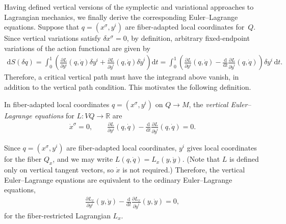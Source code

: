 \documentclass[pdftex]{sigma}
\numberwithin{equation}{section}
\begin{document}
Having def\/ined vertical versions of the symplectic and variational approaches to Lagrangian mechanics, we f\/inally derive the corresponding Euler--Lagrange equations. Suppose that $ q = ( x ^\sigma , y ^i ) $ are f\/iber-adapted local coordinates for~$Q$. Since vertical variations satisfy $ \delta x ^\sigma = 0 $, by def\/inition, arbitrary f\/ixed-endpoint variations of the action functional are given by
\begin{gather*}
 \mathrm{d} S ( \delta q )= \int _0 ^1 \left( \frac{ \partial L }{ \partial y ^i } ( q, \dot{q} ) \delta y ^i + \frac{ \partial L }{ \partial \dot{y} ^i } ( q, \dot{q} ) \delta \dot{y} ^i \right) \mathrm{d}t = \int _0 ^1 \left( \frac{ \partial L }{ \partial y ^i } ( q, \dot{q} ) - \frac{\mathrm{d}}{\mathrm{d}t} \frac{ \partial L }{ \partial \dot{y} ^i } ( q, \dot{q} ) \right) \delta y ^i
 \,\mathrm{d}t .
\end{gather*}
Therefore, a critical vertical path must have the integrand above vanish, in addition to the vertical path condition. This motivates the following def\/inition.

\begin{Definition}
 In f\/iber-adapted local coordinates $ q = ( x ^\sigma , y ^i ) $ on $Q \rightarrow M $, the \emph{vertical Euler--Lagrange equations} for $ L \colon V Q \rightarrow \mathbb{R} $ are
 \begin{gather} \label{eqn:verticalEL}
 \dot{x} ^\sigma = 0 , \qquad \frac{ \partial L }{ \partial y ^i } ( q, \dot{q} ) - \frac{\mathrm{d}}{\mathrm{d}t} \frac{ \partial L }{ \partial \dot{y}
 ^i } ( q, \dot{q} ) = 0 .
\end{gather}
\end{Definition}

\begin{Remark} Since $ q = ( x ^\sigma , y ^i ) $ are f\/iber-adapted local coordinates, $ y ^i $ gives local coordinates for the f\/iber $ Q _x $, and we may write $ L ( q, \dot{q} ) = L _x ( y , \dot{y} ) $. (Note that $L$ is def\/ined only on vertical tangent vectors, so $ \dot{x} $ is not required.) Therefore, the vertical Euler--Lagrange equations are equivalent to the ordinary Euler--Lagrange equations,
 \begin{gather*}
 \frac{ \partial L _x }{ \partial y ^i } ( y , \dot{y} ) - \frac{\mathrm{d}}{\mathrm{d}t} \frac{ \partial L _x }{ \partial \dot{y} ^i } ( y , \dot{y} ) = 0 ,
 \end{gather*}
 for the f\/iber-restricted Lagrangian $ L _x $.
\end{Remark}
\end{document}
